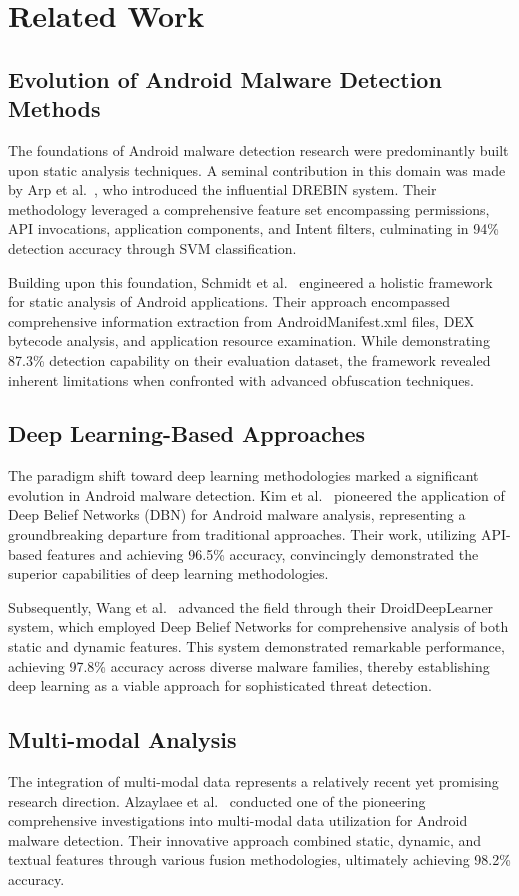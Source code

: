 \documentclass[a4paper,11pt]{article}
\begin{document}
\section{Related Work}
\subsection{Evolution of Android Malware Detection Methods}
The foundations of Android malware detection research were predominantly built upon static analysis techniques. A seminal contribution in this domain was made by Arp et al.~\cite{DrebinPaper}, who introduced the influential DREBIN system. Their methodology leveraged a comprehensive feature set encompassing permissions, API invocations, application components, and Intent filters, culminating in 94\% detection accuracy through SVM classification.

Building upon this foundation, Schmidt et al.~\cite{StaticAnalysisFramework} engineered a holistic framework for static analysis of Android applications. Their approach encompassed comprehensive information extraction from AndroidManifest.xml files, DEX bytecode analysis, and application resource examination. While demonstrating 87.3\% detection capability on their evaluation dataset, the framework revealed inherent limitations when confronted with advanced obfuscation techniques.

\subsection{Deep Learning-Based Approaches}
The paradigm shift toward deep learning methodologies marked a significant evolution in Android malware detection. Kim et al.~\cite{DeepDroid} pioneered the application of Deep Belief Networks (DBN) for Android malware analysis, representing a groundbreaking departure from traditional approaches. Their work, utilizing API-based features and achieving 96.5\% accuracy, convincingly demonstrated the superior capabilities of deep learning methodologies.

Subsequently, Wang et al.~\cite{DroidDeepLearner} advanced the field through their DroidDeepLearner system, which employed Deep Belief Networks for comprehensive analysis of both static and dynamic features. This system demonstrated remarkable performance, achieving 97.8\% accuracy across diverse malware families, thereby establishing deep learning as a viable approach for sophisticated threat detection.

\subsection{Multi-modal Analysis}
The integration of multi-modal data represents a relatively recent yet promising research direction. Alzaylaee et al.~\cite{DroidMultiModal} conducted one of the pioneering comprehensive investigations into multi-modal data utilization for Android malware detection. Their innovative approach combined static, dynamic, and textual features through various fusion methodologies, ultimately achieving 98.2\% accuracy.
\end{document}
